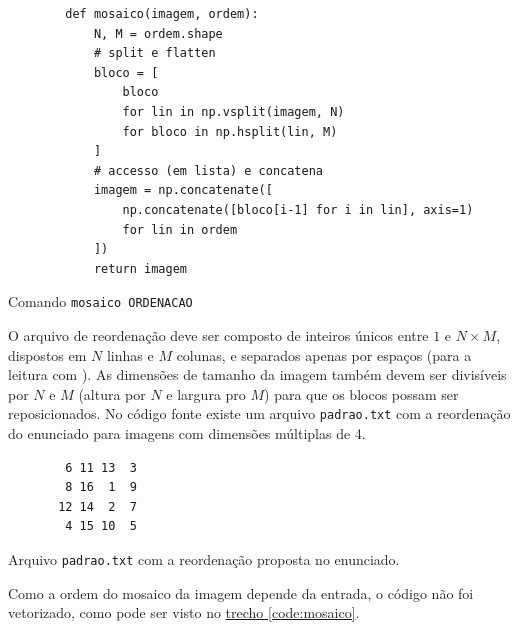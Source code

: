 \begin{listing}[H]
    \begin{verbatim}
        def mosaico(imagem, ordem):
            N, M = ordem.shape
            # split e flatten
            bloco = [
                bloco
                for lin in np.vsplit(imagem, N)
                for bloco in np.hsplit(lin, M)
            ]
            # accesso (em lista) e concatena
            imagem = np.concatenate([
                np.concatenate([bloco[i-1] for i in lin], axis=1)
                for lin in ordem
            ])
            return imagem
    \end{verbatim}

    \caption{Comando \texttt{mosaico ORDENACAO}}
    \label{code:mosaico}
\end{listing}

O arquivo de reordenação deve ser composto de inteiros únicos entre $1$ e $N \times M$, dispostos em $N$ linhas e $M$ colunas, e separados apenas por espaços (para a leitura com  \autocite{ref:loadtxt}). As dimensões de tamanho da imagem também devem ser divisíveis por $N$ e $M$ (altura por $N$ e largura pro $M$) para que os blocos possam ser reposicionados. No código fonte existe um arquivo \texttt{padrao.txt} com a reordenação do enunciado para imagens com dimensões múltiplas de 4.

\begin{listing}[H]
    \begin{verbatim}
        6 11 13  3
        8 16  1  9
       12 14  2  7
        4 15 10  5
    \end{verbatim}

    \caption{Arquivo \texttt{padrao.txt} com a reordenação proposta no enunciado.}
\end{listing}

Como a ordem do mosaico da imagem depende da entrada, o código não foi vetorizado, como pode ser visto no \hyperref[code:mosaico]{trecho \ref*{code:mosaico}}.
